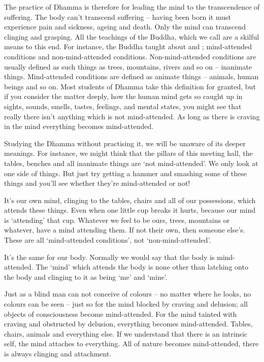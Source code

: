 The practice of Dhamma is therefore for leading the mind to the transcendence of suffering. The body can't transcend suffering -- having been born it must experience pain and sickness, ageing and death. Only the mind can transcend clinging and grasping. All the teachings of the Buddha, which we call  are a skilful means to this end. For instance, the Buddha taught about  and ; mind-attended conditions and non-mind-attended conditions. Non-mind-attended conditions are usually defined as such things as trees, mountains, rivers and so on -- inanimate things. Mind-attended conditions are defined as animate things -- animals, human beings and so on. Most students of Dhamma take this definition for granted, but if you consider the matter deeply, how the human mind gets so caught up in sights, sounds, smells, tastes, feelings, and mental states, you might see that really there isn't anything which is not mind-attended. As long as there is craving in the mind everything becomes mind-attended.

Studying the Dhamma without practising it, we will be unaware of its deeper meanings. For instance, we might think that the pillars of this meeting hall, the tables, benches and all inanimate things are `not mind-attended'. We only look at one side of things. But just try getting a hammer and smashing some of these things and you'll see whether they're mind-attended or not!

It's our own mind, clinging to the tables, chairs and all of our possessions, which attends these things. Even when one little cup breaks it hurts, because our mind is `attending' that cup. Whatever we feel to be ours, trees, mountains or whatever, have a mind attending them. If not their own, then someone else's. These are all `mind-attended conditions', not `non-mind-attended'.

It's the same for our body. Normally we would say that the body is mind-attended. The `mind' which attends the body is none other than  latching onto the body and clinging to it as being `me' and `mine'.

Just as a blind man can not conceive of colours -- no matter where he looks, no colours can be seen -- just so for the mind blocked by craving and delusion; all objects of consciousness become mind-attended. For the mind tainted with craving and obstructed by delusion, everything becomes mind-attended. Tables, chairs, animals and everything else. If we understand that there is an intrinsic self, the mind attaches to everything. All of nature becomes mind-attended, there is always clinging and attachment.

